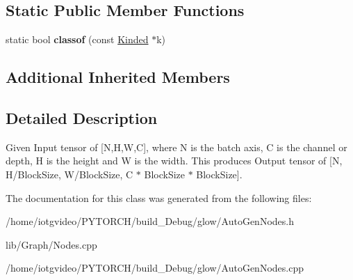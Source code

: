 \subsection*{Static Public Member Functions}
\begin{DoxyCompactItemize}
\item 
\mbox{\label{classglow_1_1_space_to_depth_node_ab0f3e45d9376476b81a89b14aa47c2be}} 
static bool {\bfseries classof} (const \hyperlink{classglow_1_1_kinded}{Kinded} $\ast$k)
\end{DoxyCompactItemize}
\subsection*{Additional Inherited Members}


\subsection{Detailed Description}
Given Input tensor of \mbox{[}N,H,W,C\mbox{]}, where N is the batch axis, C is the channel or depth, H is the height and W is the width. This produces Output tensor of \mbox{[}N, H/\+Block\+Size, W/\+Block\+Size, C $\ast$ Block\+Size $\ast$ Block\+Size\mbox{]}. 

The documentation for this class was generated from the following files\+:\begin{DoxyCompactItemize}
\item 
/home/iotgvideo/\+P\+Y\+T\+O\+R\+C\+H/build\+\_\+\+Debug/glow/Auto\+Gen\+Nodes.\+h\item 
lib/\+Graph/Nodes.\+cpp\item 
/home/iotgvideo/\+P\+Y\+T\+O\+R\+C\+H/build\+\_\+\+Debug/glow/Auto\+Gen\+Nodes.\+cpp\end{DoxyCompactItemize}
